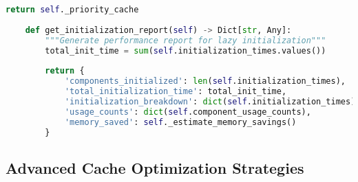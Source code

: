 \begin{lstlisting}[language=Python, caption=Lazy Component Initialization with Performance Tracking]
        return self._priority_cache
    
    def get_initialization_report(self) -> Dict[str, Any]:
        """Generate performance report for lazy initialization"""
        total_init_time = sum(self.initialization_times.values())
        
        return {
            'components_initialized': len(self.initialization_times),
            'total_initialization_time': total_init_time,
            'initialization_breakdown': dict(self.initialization_times),
            'usage_counts': dict(self.component_usage_counts),
            'memory_saved': self._estimate_memory_savings()
        }
\end{lstlisting}

\subsection{Advanced Cache Optimization Strategies}
\label{appendix:cache-optimization}


